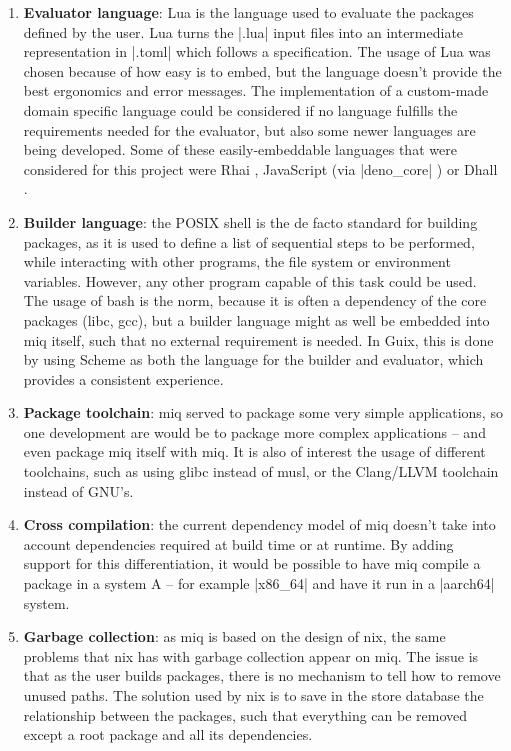 \begin{enumerate}
    \item \textbf{Evaluator language}: Lua is the language
    used to evaluate the packages defined by the user. Lua
    turns the |.lua| input files into an intermediate
    representation in |.toml| which follows a
    specification. The usage of Lua was chosen because of
    how easy is to embed, but the language doesn't provide
    the best ergonomics and error messages. The
    implementation of a custom-made domain specific language
    could be considered if no language fulfills the
    requirements needed for the evaluator, but also some
    newer languages are being developed. Some of these
    easily-embeddable languages that were
    considered for this project were Rhai
    \cite{RhaiEmbeddedScripting}, JavaScript (via
    |deno_core| \cite{DenoCoreCrates2023}) or Dhall \cite{DhallConfigurationLanguage}.

    \item \textbf{Builder language}: the POSIX shell is the
    de facto standard for building packages, as it is used
    to define a list of sequential steps to be performed,
    while interacting with other programs, the file system or
    environment variables. However, any other program
    capable of this task could be used. The usage of bash is
    the norm, because it is often a dependency of the core
    packages (libc, gcc), but a builder language might as
    well be embedded into miq itself, such that no external
    requirement is needed. In Guix, this is done by using
    Scheme as both the language for the builder and
    evaluator, which provides a consistent experience.

    \item \textbf{Package toolchain}: miq served to package
    some very simple applications, so one development are
    would be to package more complex applications -- and
    even package miq itself with miq. It is also of interest
    the usage of different toolchains, such as using glibc
    instead of musl, or the Clang/LLVM toolchain instead of GNU's.

    \item \textbf{Cross compilation}: the current dependency
    model of miq doesn't take into account dependencies
    required at build time or at runtime. By adding support
    for this differentiation, it would be possible to have
    miq compile a package in a system A -- for example
    |x86_64| and have it run in a |aarch64| system.

    \item \textbf{Garbage collection}: as miq is based on
    the design of nix, the same problems that nix has with
    garbage collection appear on miq. The issue is that as
    the user builds packages, there is no mechanism to tell
    how to remove unused paths. The solution used by nix is
    to save in the store database the relationship between
    the packages, such that everything can be removed except
    a root package and all its dependencies.


\end{enumerate}
